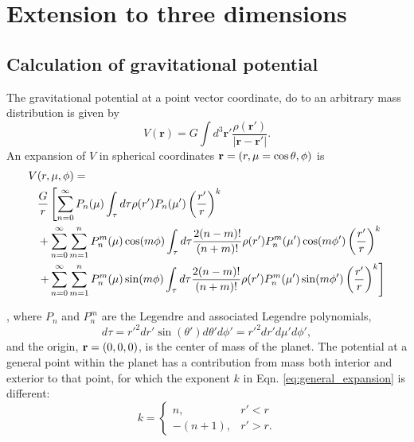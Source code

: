 \section{Extension to three dimensions} \label{method_derivation}

\subsection{Calculation of gravitational potential} \label{calc_grav_pot}

The gravitational potential at a point vector coordinate, do to an arbitrary mass
distribution is given by 
%
\begin{equation} \label{eq:basicV}
    V(\mathbf{r}) = G \int d^3\mathbf{r'}
    \frac{\rho(\mathbf{r'})}{\left|\mathbf{r}-\mathbf{r'}\right|}.
\end{equation} 
%
An expansion of $V$ in spherical coordinates ${\bf r} = (r,\mu =
\cos{\theta},\phi)$ is
%
\begin{equation}
    \begin{aligned} V&(r,\mu,\phi) = \\
        &\frac{G}{r} \left[ \sum_{n=0}^{\infty} P_n(\mu) \int_{\tau} d\tau
            \rho(r')P_n(\mu')\left(\frac{r'}{r}\right)^k \right. \\ & +
            \sum_{n=0}^{\infty} \sum_{m=1}^{n} P^m_n(\mu)\cos(m\phi) \int_{\tau} d\tau
            \frac{2(n-m)!}{(n+m)!} \rho(r')P_n^m(\mu')\cos(m\phi')
            \left(\frac{r'}{r}\right)^k \\ & \left.  + \sum_{n=0}^{\infty}
            \sum_{m=1}^{n} P^m_n(\mu)\sin(m\phi) \int_{\tau} d\tau \frac{2(n-m)!}{(n+m)!}
            \rho(r')P_n^m(\mu')\sin(m\phi') \left(\frac{r'}{r}\right)^k \right]
        \end{aligned} \label{eq:general_expansion}
    \end{equation}

\citep{zharkov1978}, where $P_n$ and $P_n^m$ are the Legendre and associated Legendre
polynomials, 
%
\begin{equation*} d\tau = r'^2 dr' \sin(\theta')d\theta' d\phi' = r'^2 dr' d\mu' d\phi',
\end{equation*}
%
and the origin, ${\bf r}=(0,0,0)$, is the center of mass of the planet.  The
potential at a general point within the planet has a contribution from mass both
interior and exterior to that point, for which the exponent $k$ in Eqn.
\eqref{eq:general_expansion} is different:
%
\begin{equation*} k = \begin{cases} n, & r' < r \\ -(n+1), & r' > r .  \end{cases}
\end{equation*}

